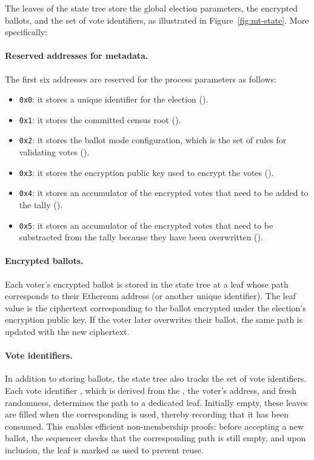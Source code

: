 The leaves of the state tree store the global election parameters, the encrypted ballots, and the set of vote identifiers, as illustrated in Figure~\ref{fig:mt-state}. More specifically:

\paragraph{Reserved addresses for metadata.} The first six addresses are reserved for the process parameters as follows:

\begin{itemize}
	\item \texttt{0x0}: it stores a unique identifier for the election (\processid).
	\item \texttt{0x1}: it stores the committed census root (\censusroot). %
	\item \texttt{0x2}: it stores the ballot mode configuration, which is the set of rules for validating votes (\ballotmode). 
	\item \texttt{0x3}: it stores the encryption public key used to encrypt the votes (\epk).
	\item \texttt{0x4}: it stores an accumulator of the encrypted votes that need to be added to the tally (\addaccumulator). 
	\item \texttt{0x5}: it stores an accumulator of the encrypted votes that need to be substracted from the tally because they have been overwritten (\substractaccumulator).	
\end{itemize}

\paragraph{Encrypted ballots.} Each voter’s encrypted ballot is stored in the state tree at a leaf whose path corresponds to their Ethereum address (or another unique identifier). The leaf value is the ciphertext corresponding to the ballot encrypted under the election’s encryption public key. If the voter later overwrites their ballot, the same path is updated with the new ciphertext.

\paragraph{Vote identifiers.}  In addition to storing ballots, the state tree also tracks the set of vote identifiers. Each vote identifier \voteid, which is derived from the \processid, the voter’s address, and fresh randomness, determines the path to a dedicated leaf. Initially empty, these leaves are filled when the corresponding \voteid is used, thereby recording that it has been consumed. This enables efficient non-membership proofs: before accepting a new ballot, the sequencer checks that the corresponding \voteid path is still empty, and upon inclusion, the leaf is marked as used to prevent reuse. \\

